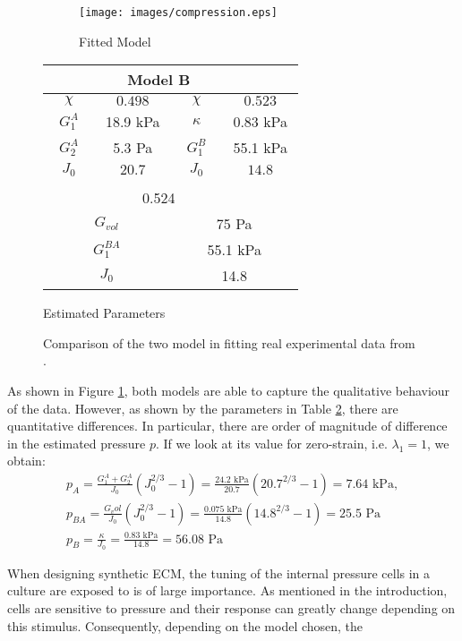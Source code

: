 \begin{figure}
	\hspace{-8mm}
	\begin{subfigure}{0.62\textwidth}
		\hspace{6mm}
		\texttt{[image: images/compression.eps]}
		\caption{Fitted Model}
		\label{fit}
	\end{subfigure}
	\begin{subtable}{0.375\textwidth}
			\begin{tabular}{c | c ||c| c }		
				\hline\addlinespace[2pt]
				 \multicolumn{2}{c||}{Model A} &  \multicolumn{2}{c}{Model B}\\[0.5mm]
				\hline\addlinespace[2pt]
				$\quad \chi\quad$ & $\quad0.498\quad$ &$\quad \chi\quad$&$\quad0.523\quad$\\[0.5mm]
				$G^A_1$ & 18.9 kPa&$\kappa$& 0.83 kPa\\[0.5mm]
				$G^A_2$ & 5.3 Pa&$G^B_1$& 55.1 kPa\\[0.5mm]
				$J_0$ & $20.7$&  $J_0$&$14.8$\\[0.5mm]
				\hline\addlinespace[2pt]
				\multicolumn{4}{c}{Model BA}\\[0.5mm]
				\hline\addlinespace[2pt]
				\multicolumn{2}{c|}{$\chi$} & \multicolumn{2}{c}{0.524}  \\
				\multicolumn{2}{c|}{$G_{vol}$} & \multicolumn{2}{c}{75 Pa}  \\
	            \multicolumn{2}{c|}{$G^{BA}_{1}$} & \multicolumn{2}{c}{55.1 kPa} \\
				\multicolumn{2}{c|}{$J_0$} & 	\multicolumn{2}{c}{ 14.8}\\
				\hline
			\end{tabular}
		\caption{Estimated Parameters}
		\label{param}
	\end{subtable}
\caption{Comparison of the two model in fitting real experimental data from \cite{Netti}.}		
\end{figure}

As shown in Figure \ref{fit}, both models are able to capture the qualitative behaviour of the data. However, as shown by the parameters in Table \ref{param}, there are quantitative differences. In particular, there are order of magnitude of difference in the estimated pressure $p$. If we look at its value for zero-strain, i.e. $\lambda_1=1$, we obtain: 
\begin{gather}
p_A = \frac{G^A_1+G^A_2}{J_0}(J_0^{2/3}-1) = \frac{24.2 \text{ kPa}}{20.7}(20.7^{2/3}-1) = 7.64 \text{ kPa},\\
p_{BA} = \frac{G_vol}{J_0}(J_0^{2/3}-1) = \frac{0.075 \text{ kPa}}{14.8}(14.8^{2/3}-1) = 25.5 \text{ Pa}\\
p_B = \frac{\kappa}{J_0} = \frac{0.83 \text{ kPa}}{14.8} = 56.08 \text{ Pa}
\end{gather}

When designing synthetic ECM, the tuning of the internal pressure cells in a culture are exposed to is of large importance. As mentioned in the introduction, cells are sensitive to pressure and their response can greatly change depending on this stimulus. Consequently, depending on the model chosen, the

